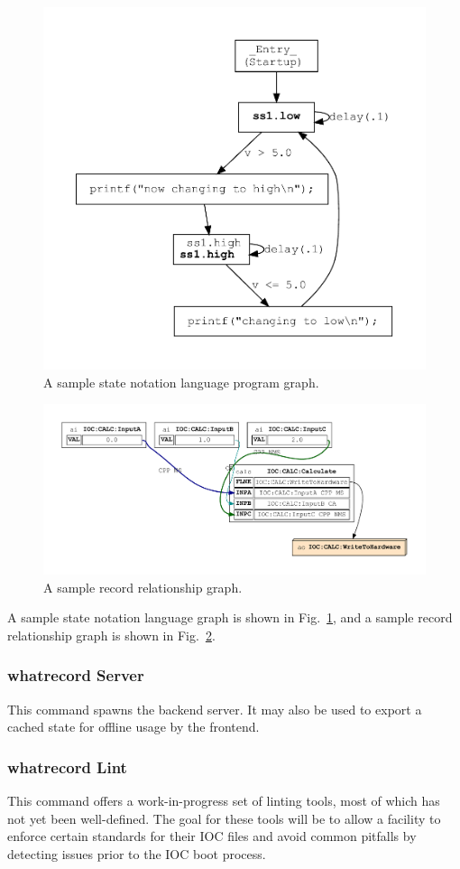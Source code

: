\documentclass[letter,
               keeplastbox,   %
               ]{jacow}
\begin{document}
\begin{figure}
   \centering
   \includegraphics*[width=.7\columnwidth]{st-simple}
   \caption{A sample state notation language program graph.}
   \label{fig:simple.st}
\end{figure}

\begin{figure}
   \centering
   \includegraphics*[width=.9\columnwidth]{calc-records}
   \caption{A sample record relationship graph.}
   \label{fig:records}
\end{figure}

A sample state notation language graph is shown in Fig.~\ref{fig:simple.st},
and a sample record relationship graph is shown in Fig.~\ref{fig:records}.

\subsubsection{whatrecord Server} This command spawns the backend server.  It
may also be used to export a cached state for offline usage by the frontend.

\subsubsection{whatrecord Lint} This command offers a work-in-progress set of
linting tools, most of which has not yet been well-defined.  The goal for these
tools will be to allow a facility to enforce certain standards for their IOC
files and avoid common pitfalls by detecting issues prior to the IOC boot
process.
\end{document}
